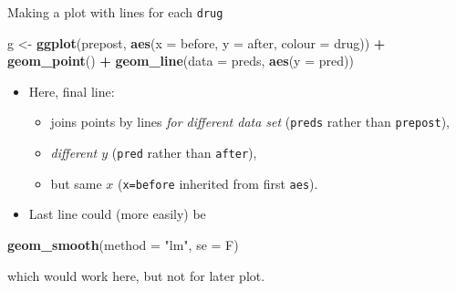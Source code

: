 \documentclass[
  ignorenonframetext,
]{beamer}
\newenvironment{Shaded}{\begin{snugshade}}{\end{snugshade}}
\newcommand{\DataTypeTok}[1]{\textcolor[rgb]{0.13,0.29,0.53}{#1}}
\newcommand{\KeywordTok}[1]{\textcolor[rgb]{0.13,0.29,0.53}{\textbf{#1}}}
\newcommand{\NormalTok}[1]{#1}
\newcommand{\OperatorTok}[1]{\textcolor[rgb]{0.81,0.36,0.00}{\textbf{#1}}}
\newcommand{\StringTok}[1]{\textcolor[rgb]{0.31,0.60,0.02}{#1}}
\begin{document}
\begin{frame}[fragile]{Making a plot with lines for each \texttt{drug}}
\protect\hypertarget{making-a-plot-with-lines-for-each-drug}{}

\begin{Shaded}
\begin{Highlighting}[]
\NormalTok{g <-}\StringTok{ }\KeywordTok{ggplot}\NormalTok{(prepost,}
  \KeywordTok{aes}\NormalTok{(}\DataTypeTok{x =}\NormalTok{ before, }\DataTypeTok{y =}\NormalTok{ after, }\DataTypeTok{colour =}\NormalTok{ drug)) }\OperatorTok{+}
\StringTok{  }\KeywordTok{geom_point}\NormalTok{() }\OperatorTok{+}\StringTok{ }\KeywordTok{geom_line}\NormalTok{(}\DataTypeTok{data =}\NormalTok{ preds, }\KeywordTok{aes}\NormalTok{(}\DataTypeTok{y =}\NormalTok{ pred))}
\end{Highlighting}
\end{Shaded}

\begin{itemize}
\item
  Here, final line:

  \begin{itemize}
  \item
    joins points by lines \emph{for different data
    set} (\texttt{preds} rather than \texttt{prepost}),
  \item
    \emph{different \(y\)} (\texttt{pred} rather than \texttt{after}),
  \item
    but same \(x\) (\texttt{x=before} inherited from first
    \texttt{aes}).
  \end{itemize}
\item
  Last line could (more easily) be
\end{itemize}

\begin{Shaded}
\begin{Highlighting}[]
\KeywordTok{geom_smooth}\NormalTok{(}\DataTypeTok{method =} \StringTok{"lm"}\NormalTok{, }\DataTypeTok{se =}\NormalTok{ F)}
\end{Highlighting}
\end{Shaded}

which would work here, but not for later plot.

\end{frame}
\end{document}
